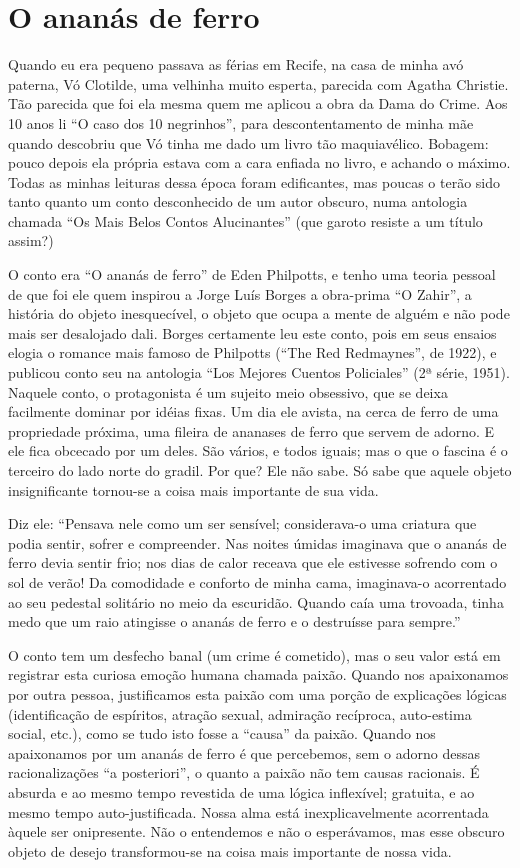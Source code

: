 \chapter{O ananás de ferro}

Quando eu era pequeno passava as férias em Recife, na casa de minha
avó paterna, Vó Clotilde, uma velhinha muito esperta, parecida com
Agatha Christie. Tão parecida que foi ela mesma quem me aplicou a
obra da Dama do Crime. Aos 10 anos li “O caso dos 10 negrinhos”, para
descontentamento de minha mãe quando descobriu que Vó tinha me dado
um livro tão maquiavélico. Bobagem: pouco depois ela própria estava
com a cara enfiada no livro, e achando o máximo. Todas as minhas
leituras dessa época foram edificantes, mas poucas o terão sido tanto
quanto um conto desconhecido de um autor obscuro, numa antologia
chamada “Os Mais Belos Contos Alucinantes” (que garoto resiste a um
título assim?)

O conto era “O ananás de ferro” de Eden Philpotts, e tenho uma teoria
pessoal de que foi ele quem inspirou a Jorge Luís Borges a obra-prima
“O Zahir”, a história do objeto inesquecível, o objeto que ocupa a
mente de alguém e não pode mais ser desalojado dali. Borges
certamente leu este conto, pois em seus ensaios elogia o romance mais
famoso de Philpotts (“The Red Redmaynes”, de 1922), e publicou conto
seu na antologia “Los Mejores Cuentos Policiales” (2ª série, 1951). 
Naquele conto, o protagonista é um sujeito meio obsessivo, que se
deixa facilmente dominar por idéias fixas. Um dia ele avista, na
cerca de ferro de uma propriedade próxima, uma fileira de ananases de
ferro que servem de adorno. E ele fica obcecado por um deles. São
vários, e todos iguais; mas o que o fascina é o terceiro do lado
norte do gradil. Por que? Ele não sabe. Só sabe que aquele objeto
insignificante tornou-se a coisa mais importante de sua vida.

Diz ele: “Pensava nele como um ser sensível; considerava-o uma
criatura que podia sentir, sofrer e compreender. Nas noites úmidas
imaginava que o ananás de ferro devia sentir frio; nos dias de calor
receava que ele estivesse sofrendo com o sol de verão! Da comodidade
e conforto de minha cama, imaginava-o acorrentado ao seu pedestal
solitário no meio da escuridão. Quando caía uma trovoada, tinha medo
que um raio atingisse o ananás de ferro e o destruísse para sempre.”

O conto tem um desfecho banal (um crime é cometido), mas o seu valor
está em registrar esta curiosa emoção humana chamada paixão. Quando
nos apaixonamos por outra pessoa, justificamos esta paixão com uma
porção de explicações lógicas (identificação de espíritos, atração
sexual, admiração recíproca, auto-estima social, etc.), como se tudo
isto fosse a “causa” da paixão. Quando nos apaixonamos por um ananás
de ferro é que percebemos, sem o adorno dessas racionalizações “a
posteriori”, o quanto a paixão não tem causas racionais. É absurda e
ao mesmo tempo revestida de uma lógica inflexível; gratuita, e ao
mesmo tempo auto-justificada. Nossa alma está inexplicavelmente
acorrentada àquele ser onipresente. Não o entendemos e não o
esperávamos, mas esse obscuro objeto de desejo transformou-se na
coisa mais importante de nossa vida.

